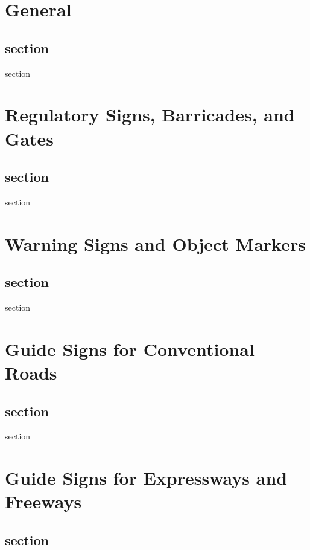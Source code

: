 \documentclass[9pt]{memoir}
\newif\ifshowstatus
\newcommand{\status}[1]{\ifshowstatus\section*{Status}\par#1\par\fi}
\begin{document}
\chapter{General}

\status{Blank.}

\section{section}

section

\chapter{Regulatory Signs, Barricades, and Gates}

\status{Blank.}

\section{section}

section

\chapter{Warning Signs and Object Markers}

\status{Blank.}

\section{section}

section

\chapter{Guide Signs for Conventional Roads}

\status{Blank.}

\section{section}

section

\chapter{Guide Signs for Expressways and Freeways}

\status{Blank.}

\section{section}
\end{document}
